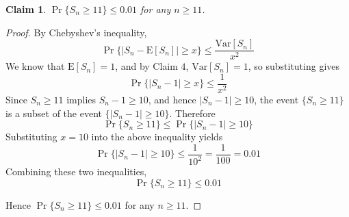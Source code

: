 \documentclass{article}
\newtheorem{claim}{Claim}
\begin{document}
\begin{claim}
    $\Pr\{S_n \geq 11\} \leq 0.01$ for any $n \geq 11$.
\end{claim}

\begin{proof}
    By Chebyshev's inequality, 
    \[
    \Pr\{|S_n - \mathrm{E}[S_n]| \geq x\} \leq \frac{\mathrm{Var}[S_n]}{x^2}
    \]
    We know that $\mathrm{E}[S_n] = 1$, and by Claim $4$, $\mathrm{Var}[S_n] = 1$, so substituting 
    gives
    \[
    \Pr\{|S_n - 1| \geq x\} \leq \frac{1}{x^2}
    \]
    Since $S_n \geq 11$ implies $S_n - 1 \geq 10$, and hence $|S_n - 1| \geq 10$, the event 
    $\{S_n \geq 11\}$ is a subset of the event $\{|S_n - 1| \geq 10\}$. Therefore 
    \[
    \Pr\{S_n \geq 11\} \leq \Pr\{|S_n - 1| \geq 10\}
    \]
    Substituting $x = 10$ into the above inequality yields 
    \[
    \Pr\{|S_n - 1| \geq 10\} \leq \frac{1}{10^2} = \frac{1}{100} = 0.01
    \]
    Combining these two inequalities, 
    \[
    \Pr\{S_n \geq 11\} \leq 0.01
    \]

    \medskip

    Hence $\Pr\{S_n \geq 11\} \leq 0.01$ for any $n \geq 11$.
\end{proof}
\end{document}
